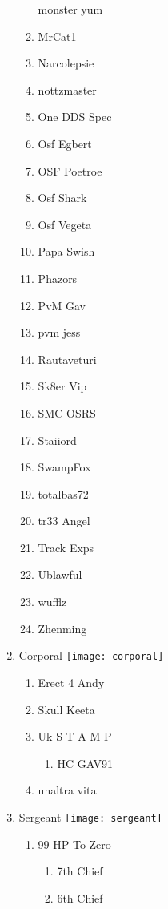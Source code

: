 \documentclass{article}
\begin{document}
\begin{enumerate}[I]
\begin{enumerate}[I]
	monster yum
      \item
	MrCat1
      \item
	Narcolepsie
      \item
	nottzmaster
      \item
	One DDS Spec
      \item
	Osf Egbert
      \item
	OSF Poetroe
      \item
	Osf Shark
      \item
	Osf Vegeta
      \item
	Papa Swish
      \item
	Phazors
      \item
	PvM Gav
      \item
	pvm jess
      \item
	Rautaveturi
      \item
	Sk8er Vip
      \item
	SMC OSRS
      \item
	Staiiord
      \item
	SwampFox
      \item
	totalbas72
      \item
	tr33 Angel
      \item
	Track Exps
      \item
	Ublawful
      \item
	wufflz
      \item
	Zhenming
    \end{enumerate}
  \item
    Corporal \texttt{[image: corporal]}
    \begin{enumerate}[I]
      \item
	Erect 4 Andy
      \item
	Skull Keeta
      \item
	Uk S T A M P
	\begin{enumerate}[I]
	  \item
	    HC GAV91
	\end{enumerate}
      \item
	unaltra vita
    \end{enumerate}
  \item
    Sergeant \texttt{[image: sergeant]}
    \begin{enumerate}[I]
      \item 
	99 HP To Zero
	\begin{enumerate}[I]
	  \item
	    7th Chief
	  \item
	    6th Chief
	\end{enumerate}

\end{enumerate}
\end{enumerate}
\end{document}
